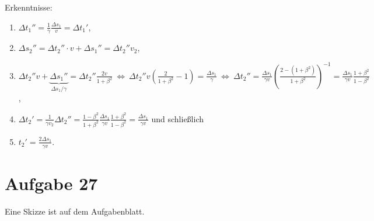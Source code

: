 Erkenntnisse: 
\begin{enumerate}
	\item $\Delta t_1'' = \frac{1}{\gamma} \frac{\Delta s_1}{v} = \Delta t_1'$,
	\item $\Delta s_2'' = \Delta t_2'' \cdot v + \Delta s_1'' = \Delta t_2'' v_2$,
	\item $\Delta t_2'' v + \underbrace{\Delta s_1''}_{\Delta s_1 / \gamma} = \Delta t_2'' \frac{2 v}{1 + \beta^2} 
	~\Leftrightarrow~ 
	\Delta t_2'' v \left( \frac{2}{1 + \beta^2} - 1 \right) = \frac{\Delta s_1}{\gamma} 
	~\Leftrightarrow~
	\Delta t_2'' = \frac{\Delta s_1}{\gamma v} \left( \frac{2 - (1 + \beta^2)}{1 + \beta^2} \right)^{-1} = \frac{\Delta s_1}{\gamma v} \frac{1 + \beta^2}{1 - \beta^2}$,
	\item $\Delta t_2' = \frac{1}{\gamma v_2} \Delta t_2'' = \frac{1 - \beta^2}{1 + \beta^2} \frac{\Delta s_1}{\gamma v} \frac{1 + \beta^2}{1 - \beta^2} = \frac{\Delta s_1}{\gamma v}$ und schließlich
	\item $t_2' = \frac{2 \Delta s_1}{\gamma v}$.
\end{enumerate}
 
\section*{Aufgabe 27}

Eine Skizze ist auf dem Aufgabenblatt. 

